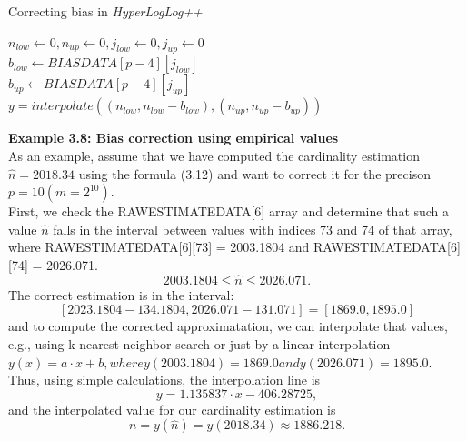\documentclass[a4paper,13pt]{article}
\theoremstyle{mytheor}
\begin{document}
\begin{algorithm}[H]
    \vspace{0.25cm}
    \DontPrintSemicolon
    \LinesNumberedHidden
    \caption[]{Correcting bias in \textit{HyperLogLog++}}
    $n_{low} \gets 0, n_{up} \gets 0, j_{low} \gets 0, j_{up} \gets 0 $\\
    $b_{low} \gets BIASDATA[p-4][j_{low}]$\\
    $b_{up} \gets BIASDATA[p-4][j_{up}]$\\
    $y = interpolate\left(\left(n_{low}, n_{low} - b_{low}\right), \left(n_{up}, n_{up} - b_{up
    }\right)\right)$\\
    \vspace{0.25cm}
\end{algorithm}
\begin{mdframed}
    \vspace{0.25cm}
    \textbf{Example 3.8: Bias correction using empirical values}\\
    As an example, assume that we have computed the cardinality estimation
    $\hat{n} = 2018.34$ using the formula (3.12) and want to correct it for the precison
    $p = 10 (m = 2^{10})$.\\
    First, we check the RAWESTIMATEDATA[6] array and determine that such
    a value $\hat{n}$ falls in the interval between values with indices 73 and 74 of
    that array, where RAWESTIMATEDATA[6][73] = 2003.1804 and
    RAWESTIMATEDATA[6][74] = 2026.071.
    \[2003.1804 \le \hat{n} \le 2026.071.\]
    The correct estimation is in the interval:
    \[\left[2023.1804 - 134.1804, 2026.071 - 131.071\right] = \left[1869.0, 1895.0\right]\]
    and to compute the corrected approximatation, we can interpolate that
    values, e.g., using k-nearest neighbor search or just by a linear interpolation\\
    $y(x) = a \cdot x + b, where y(2003.1804) = 1869.0 and y(2026.071) = 1895.0.$\\
    Thus, using simple calculations, the interpolation line is
    \[y = 1.135837 \cdot x - 406.28725,\]
    and the interpolated value for our cardinality estimation is
    \[n = y(\hat{n}) = y(2018.34) \approx 1886.218.\]
    
\end{mdframed}
\end{document}
